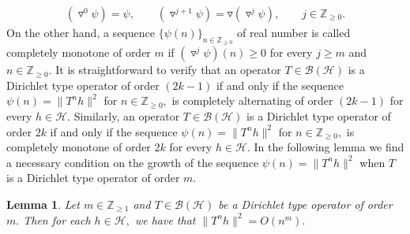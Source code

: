 \documentclass[10pt,oneside,reqno]{amsart}
\newtheorem{lemma}[theorem]{Lemma}
\theoremstyle{definition}
\theoremstyle{remark}
\newcommand{\calH}{{\mathcal{H}}}
\numberwithin{equation}{section}
\begin{document}
\begin{align*}
    (\triangledown ^0 \psi)=\psi, \qquad (\triangledown ^{j+1}\psi)= \triangledown (\triangledown^j \psi),\qquad j\in \mathbb Z_{\geqslant 0}.
\end{align*}
On the other hand, a sequence $\{\psi(n)\}_{n \in \mathbb Z_{\geqslant 0}}$ of real number is called completely monotone of order $m$ if $(\triangledown^j \psi)(n) \geqslant 0$ for every $j\geqslant m$ and $n\in \mathbb Z_{\geqslant 0}.$ It is straightforward to verify that an operator $T\in \mathcal B(\calH)$ is a Dirichlet type operator of order $(2k-1)$ if and only if the sequence $\psi(n)= \|T^nh\|^2$ for $n\in \mathbb Z_{\geqslant 0},$ is completely alternating of order $(2k-1)$ for every $h\in \mathcal H.$  Similarly, an operator $T\in \mathcal B(\calH)$ is a Dirichlet type operator of order $2k$ if and only if the sequence $\psi(n)= \|T^nh\|^2$ for $n\in \mathbb Z_{\geqslant 0},$ is completely monotone of order $2k$ for every $h\in \mathcal H.$ In the following lemma we find a necessary condition on the growth of the sequence $\psi(n)=\|T^nh\|^2$ when $T$ is a Dirichlet type operator of order $m.$
\begin{lemma}\label{order of CAk}
    Let $m\in\mathbb Z_{\geqslant 1}$ and $T\in \mathcal B(\calH)$ be a Dirichlet type operator of order $m.$ Then for each $h\in\mathcal H,$ we have that $\|T^nh\|^2=O(n^{m}).$
\end{lemma}
\end{document}
